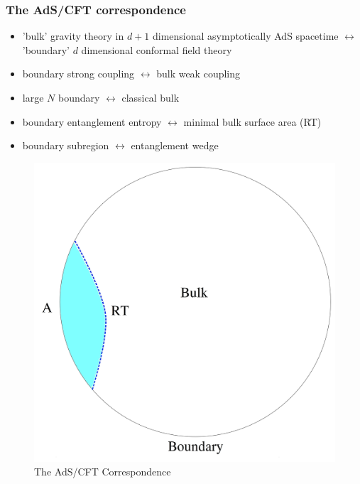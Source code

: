 \documentclass[10pt,aspectratio=169]{beamer}
\begin{document}
\begin{frame}
\frametitle{The AdS/CFT correspondence}

\begin{minipage}[t]{0.48\linewidth}

\begin{itemize}

\item 'bulk' gravity theory in $d+1$ dimensional  asymptotically AdS spacetime $\leftrightarrow$ 'boundary' $d$ dimensional conformal field theory

\item boundary strong coupling $\leftrightarrow$ bulk weak coupling

\item large $N$ boundary $\leftrightarrow$ classical bulk

\item boundary entanglement entropy $\leftrightarrow$ minimal bulk surface area (RT)

\item boundary subregion $\leftrightarrow$ entanglement wedge

\end{itemize}

\end{minipage}
%
\hfill
%
\begin{minipage}[t]{0.48\linewidth}

\begin{figure}
    \begin{center}
    
        \includegraphics[scale=0.06]{adscft5}    
    
    \end{center}
    \caption{The AdS/CFT Correspondence}
\end{figure}

\end{minipage}

\end{frame}
\end{document}
